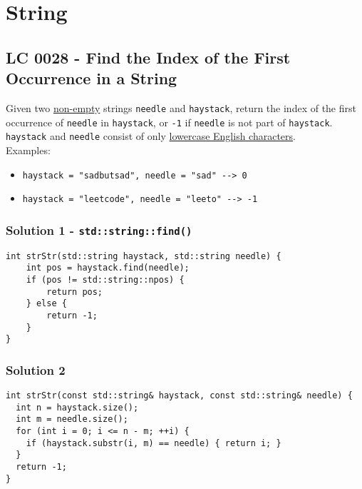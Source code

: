 \chapter{String}
\section{LC 0028 - Find the Index of the First Occurrence in a String}
Given two \ul{non-empty} strings {\colorbox{CodeBackground}{\lstinline|needle|}} and {\colorbox{CodeBackground}{\lstinline|haystack|}}, return the index of the first occurrence of {\colorbox{CodeBackground}{\lstinline|needle|}} in {\colorbox{CodeBackground}{\lstinline|haystack|}}, or {\colorbox{CodeBackground}{\lstinline|-1|}} if {\colorbox{CodeBackground}{\lstinline|needle|}} is not part of {\colorbox{CodeBackground}{\lstinline|haystack|}}.\\

{\colorbox{CodeBackground}{\lstinline|haystack|}} and {\colorbox{CodeBackground}{\lstinline|needle|}} consist of only \ul{lowercase English characters}.\\

Examples:
\begin{itemize}
	\item {\colorbox{CodeBackground}{\lstinline|haystack = "sadbutsad", needle = "sad" --> 0|}}
	\item {\colorbox{CodeBackground}{\lstinline|haystack = "leetcode", needle = "leeto" --> -1|}}
\end{itemize}

\subsection*{Solution 1 - {\colorbox{CodeBackground}{\lstinline|std::string::find()|}}}
\begin{lstlisting}
int strStr(std::string haystack, std::string needle) {
	int pos = haystack.find(needle);
	if (pos != std::string::npos) {
		return pos;
	} else {
		return -1;
	}
}
\end{lstlisting}

\subsection*{Solution 2}
\begin{lstlisting}
int strStr(const std::string& haystack, const std::string& needle) {
  int n = haystack.size();
  int m = needle.size();
  for (int i = 0; i <= n - m; ++i) {
    if (haystack.substr(i, m) == needle) { return i; }
  }
  return -1;
}
\end{lstlisting}

